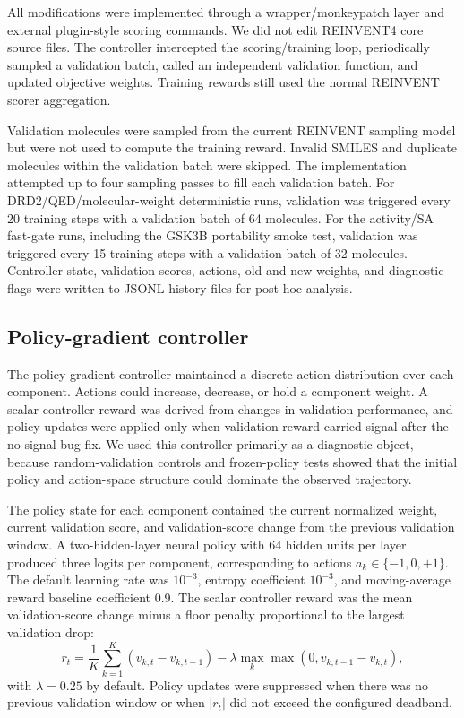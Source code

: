 \documentclass[referee,lineno,pdflatex,sn-basic]{sn-jnl}
\theoremstyle{thmstyleone}%
\theoremstyle{thmstyletwo}%
\theoremstyle{thmstylethree}%
\begin{document}
All modifications were implemented through a wrapper/monkeypatch layer and external plugin-style scoring commands. We did not edit REINVENT4 core source files. The controller intercepted the scoring/training loop, periodically sampled a validation batch, called an independent validation function, and updated objective weights. Training rewards still used the normal REINVENT scorer aggregation.

Validation molecules were sampled from the current REINVENT sampling model but were not used to compute the training reward. Invalid SMILES and duplicate molecules within the validation batch were skipped. The implementation attempted up to four sampling passes to fill each validation batch. For DRD2/QED/molecular-weight deterministic runs, validation was triggered every 20 training steps with a validation batch of 64 molecules. For the activity/SA fast-gate runs, including the GSK3B portability smoke test, validation was triggered every 15 training steps with a validation batch of 32 molecules. Controller state, validation scores, actions, old and new weights, and diagnostic flags were written to JSONL history files for post-hoc analysis.

\subsection{Policy-gradient controller}\label{subsec:policy_controller}

The policy-gradient controller maintained a discrete action distribution over each component. Actions could increase, decrease, or hold a component weight. A scalar controller reward was derived from changes in validation performance, and policy updates were applied only when validation reward carried signal after the no-signal bug fix. We used this controller primarily as a diagnostic object, because random-validation controls and frozen-policy tests showed that the initial policy and action-space structure could dominate the observed trajectory.

The policy state for each component contained the current normalized weight, current validation score, and validation-score change from the previous validation window. A two-hidden-layer neural policy with 64 hidden units per layer produced three logits per component, corresponding to actions $a_k\in\{-1,0,+1\}$. The default learning rate was $10^{-3}$, entropy coefficient $10^{-3}$, and moving-average reward baseline coefficient 0.9. The scalar controller reward was the mean validation-score change minus a floor penalty proportional to the largest validation drop:
\begin{equation}
r_t = \frac{1}{K}\sum_{k=1}^{K}(v_{k,t}-v_{k,t-1}) - \lambda \max_k \max(0, v_{k,t-1}-v_{k,t}),
\label{eq:controller_reward}
\end{equation}
with $\lambda=0.25$ by default. Policy updates were suppressed when there was no previous validation window or when $|r_t|$ did not exceed the configured deadband.
\end{document}
